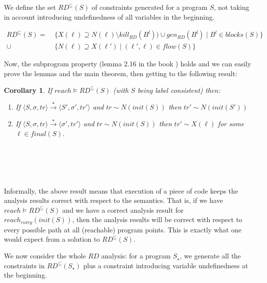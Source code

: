 \documentclass[a4wide,12pt]{article}
\theoremstyle{definition}
\theoremstyle{plain}
\newtheorem{cor}[theo]{Corollary}
\theoremstyle{remark}
\def\const#1{\mathopen{\langle}#1\mathclose{\rangle}} %
\def\pair#1{\const{#1}}
\def\starto{\overset{\star}{\to}}
\begin{document}
\section{~}
We define the set $RD^\subseteq(S)$ of constraints generated for a program $S$,
not taking in account introducing undefinedness of all variables in the beginning. 


\begin{align*} 
\label{def_constr}
RD^{\subseteq}(S) = & \; \{X(\ell) \supseteq N(\ell) \setminus kill_{RD}(B^l)) \cup gen_{RD}(B^l) \mid B^l \in blocks(S)\} \\
\cup & \; \{N(\ell) \supseteq X(\ell') \mid (\ell', \ell) \in flow(S) \}
\end{align*}


Now, the subprogram property (lemma 2.16 in the book ) holds and we can easily prove the lemmas
and the main theorem, then getting to the following result:

\begin{cor}\label{corr}
If $reach \models RD^\subseteq(S)$ (with $S$ being label consistent) then:

\begin{enumerate}
\item If $\pair{S, \sigma, tr} \starto \pair{S', \sigma', tr'}$ and $ tr \sim
N(init(S))$ then $tr' \sim N(init(S'))$
\item If $\pair{S, \sigma, tr} \starto \pair{\sigma', tr'}$ and $ tr \sim
N(init(S))$ then $tr' \sim X(\ell)$ for some $\ell \in final(S)$.
\end{enumerate}
\end{cor}

\section{~}

Informally, the above result means that execution of a piece of code keeps the analysis results correct with respect to the semantics.
That is, if we have $reach \models RD^\subseteq(S)$ and we have a correct analysis result for $reach_{entry}(init(S))$, then the analysis results will
be correct with respect to every possible path at all (reachable) program points. 
This is exactly what one would expect from a solution to $RD^\subseteq(S)$. 

We now consider the whole $RD$ analysis:
for a program $S_\star$, we generate all the constraints in $RD^\subseteq(S_\star)$ plus a constraint
introducing variable undefinedness at the beginning. 
 
\end{document}
